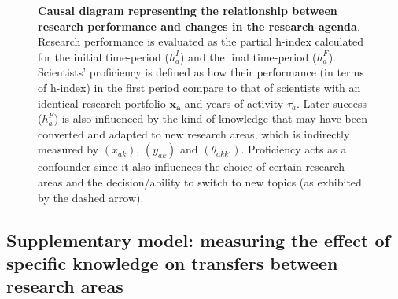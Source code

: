 \documentclass{article}
\begin{document}
\begin{figure}[h]
    \centering
    \caption{\textbf{Causal diagram representing the relationship between research performance and changes in the research agenda}. Research performance is evaluated as the partial h-index calculated for the initial time-period ($h_a^I$) and the final time-period ($h_a^F$). Scientists' proficiency is defined as how their performance (in terms of h-index) in the first period compare to that of scientists with an identical research portfolio $\bm{x_a}$ and years of activity $\tau_a$. Later success ($h_a^F$) is also influenced by the kind of knowledge that may have been converted and adapted to new research areas, which is indirectly measured by $(x_{ak})$, $(y_{ak})$ and $(\theta_{akk'})$. Proficiency acts as a confounder since it also influences the choice of certain research areas and the decision/ability to switch to new topics (as exhibited by the dashed arrow). }
    \label{fig:outcomes_causal_dag}
\end{figure}


\subsection{\label{appendix:knowledge}Supplementary model: measuring the effect of specific knowledge on transfers between research areas}
\end{document}
